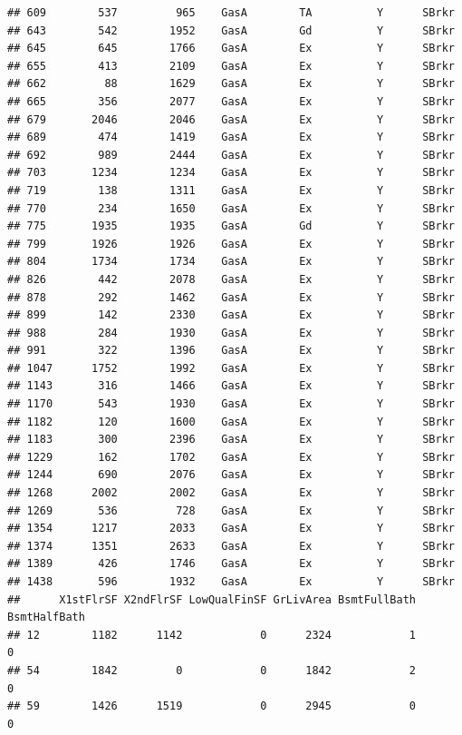\documentclass[]{article}
\begin{document}
\begin{verbatim}
## 609        537         965    GasA        TA          Y      SBrkr
## 643        542        1952    GasA        Gd          Y      SBrkr
## 645        645        1766    GasA        Ex          Y      SBrkr
## 655        413        2109    GasA        Ex          Y      SBrkr
## 662         88        1629    GasA        Ex          Y      SBrkr
## 665        356        2077    GasA        Ex          Y      SBrkr
## 679       2046        2046    GasA        Ex          Y      SBrkr
## 689        474        1419    GasA        Ex          Y      SBrkr
## 692        989        2444    GasA        Ex          Y      SBrkr
## 703       1234        1234    GasA        Ex          Y      SBrkr
## 719        138        1311    GasA        Ex          Y      SBrkr
## 770        234        1650    GasA        Ex          Y      SBrkr
## 775       1935        1935    GasA        Gd          Y      SBrkr
## 799       1926        1926    GasA        Ex          Y      SBrkr
## 804       1734        1734    GasA        Ex          Y      SBrkr
## 826        442        2078    GasA        Ex          Y      SBrkr
## 878        292        1462    GasA        Ex          Y      SBrkr
## 899        142        2330    GasA        Ex          Y      SBrkr
## 988        284        1930    GasA        Ex          Y      SBrkr
## 991        322        1396    GasA        Ex          Y      SBrkr
## 1047      1752        1992    GasA        Ex          Y      SBrkr
## 1143       316        1466    GasA        Ex          Y      SBrkr
## 1170       543        1930    GasA        Ex          Y      SBrkr
## 1182       120        1600    GasA        Ex          Y      SBrkr
## 1183       300        2396    GasA        Ex          Y      SBrkr
## 1229       162        1702    GasA        Ex          Y      SBrkr
## 1244       690        2076    GasA        Ex          Y      SBrkr
## 1268      2002        2002    GasA        Ex          Y      SBrkr
## 1269       536         728    GasA        Ex          Y      SBrkr
## 1354      1217        2033    GasA        Ex          Y      SBrkr
## 1374      1351        2633    GasA        Ex          Y      SBrkr
## 1389       426        1746    GasA        Ex          Y      SBrkr
## 1438       596        1932    GasA        Ex          Y      SBrkr
##      X1stFlrSF X2ndFlrSF LowQualFinSF GrLivArea BsmtFullBath BsmtHalfBath
## 12        1182      1142            0      2324            1            0
## 54        1842         0            0      1842            2            0
## 59        1426      1519            0      2945            0            0

\end{verbatim}
\end{document}
